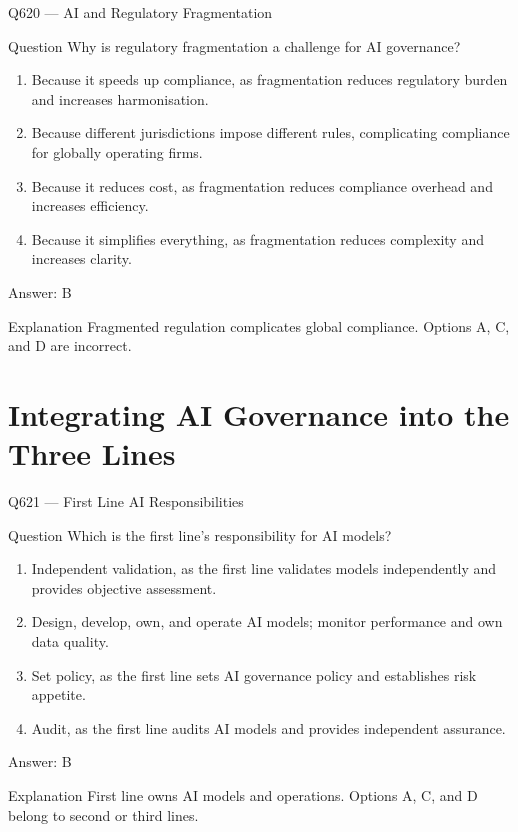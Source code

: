 \documentclass[aspectratio=169,8pt]{beamer}
\begin{document}
	\begin{frame}{Q620 --- AI and Regulatory Fragmentation}
		\begin{block}{Question}
			Why is regulatory fragmentation a challenge for AI governance?
			\begin{enumerate}
				\item Because it speeds up compliance, as fragmentation reduces regulatory burden and increases harmonisation.
				\item Because different jurisdictions impose different rules, complicating compliance for globally operating firms.
				\item Because it reduces cost, as fragmentation reduces compliance overhead and increases efficiency.
				\item Because it simplifies everything, as fragmentation reduces complexity and increases clarity.
			\end{enumerate}
		\end{block}
		\begin{exampleblock}{Answer: B}\end{exampleblock}
		\begin{block}{Explanation}
			Fragmented regulation complicates global compliance. Options A, C, and D are incorrect.
		\end{block}
	\end{frame}
	
	\section{Integrating AI Governance into the Three Lines}
	
	\begin{frame}{Q621 --- First Line AI Responsibilities}
		\begin{block}{Question}
			Which is the first line's responsibility for AI models?
			\begin{enumerate}
				\item Independent validation, as the first line validates models independently and provides objective assessment.
				\item Design, develop, own, and operate AI models; monitor performance and own data quality.
				\item Set policy, as the first line sets AI governance policy and establishes risk appetite.
				\item Audit, as the first line audits AI models and provides independent assurance.
			\end{enumerate}
		\end{block}
		\begin{exampleblock}{Answer: B}\end{exampleblock}
		\begin{block}{Explanation}
			First line owns AI models and operations. Options A, C, and D belong to second or third lines.
		\end{block}
	\end{frame}
	
\end{document}
